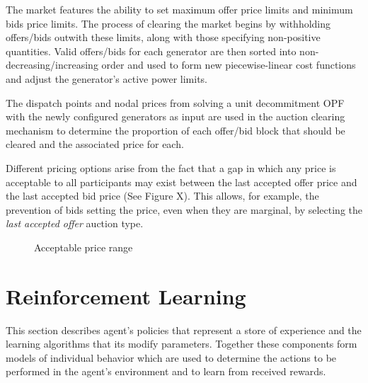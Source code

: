 The market features the ability to set maximum offer price limits and minimum
bids price limits.  The process of clearing the market begins by withholding
offers/bids outwith these limits, along with those specifying non-positive
quantities.  Valid offers/bids for each generator are then sorted into
non-decreasing/increasing order and used to form new piecewise-linear cost
functions and adjust the generator's active power limits.

The dispatch points and nodal prices from solving a unit decommitment OPF with
the newly configured generators as input are used in the auction clearing
mechanism to determine the proportion of each offer/bid block that should be
cleared and the associated price for each.

Different pricing options arise from the fact that a gap in which any price is
acceptable to all participants may exist between the last accepted offer price
and the last accepted bid price (See Figure X).  This allows, for example,
the prevention of bids setting the price, even when they are marginal, by
selecting the \textit{last accepted offer} auction type.

\begin{figure}
\label{fig:aution_types}
\centering
{}
\caption{Acceptable price range}
\end{figure}

\section{Reinforcement Learning}
\label{sec:rl}
This section describes agent's policies that represent a store of experience
and the learning algorithms that its modify parameters. Together these
components form models of individual behavior which are used to determine the
actions to be performed in the agent's environment and to learn from received
rewards.

